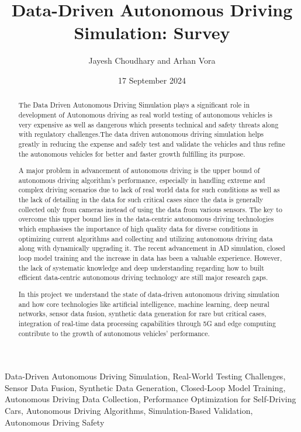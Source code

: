\documentclass[lettersize,journal]{IEEEtran}
\begin{document}
\title{Data-Driven Autonomous Driving Simulation: Survey}
\author{Jayesh Choudhary and Arhan Vora}
\date{17 September 2024}

\maketitle

\begin{abstract}
The Data Driven Autonomous Driving Simulation plays a significant role in development of Autonomous driving as real world testing of autonomous vehicles is very expensive as well as dangerous which presents technical and safety threats along with regulatory challenges.The data driven autonomous driving simulation helps greatly in reducing the expense and safely test and validate the vehicles and thus refine the autonomous vehicles for better and faster growth fulfilling its purpose.

A major problem in advancement of autonomous driving is the upper bound of autonomous driving algorithm's performance, especially in handling extreme and complex driving scenarios due to lack of real world data for such conditions as well as the lack of detailing in the data for such critical cases since the data is generally collected only from cameras instead of using the data from various sensors. The key to overcome this upper bound lies in the data-centric autonomous driving technologies which emphasises the importance of high quality data for diverse conditions in optimizing current algorithms and collecting and utilizing autonomous driving data along with dynamically upgrading it.
The recent advancement in AD simulation, closed loop model training and the increase in data has been a valuable experience. However, the lack of systematic knowledge and deep understanding regarding how to built efficient data-centric autonomous driving technology are still major research gaps.

In this project we understand the state of data-driven autonomous driving simulation and how core technologies like artificial intelligence, machine learning, deep neural networks, sensor data fusion, synthetic data generation for rare but critical cases, integration of real-time data processing capabilities through 5G and edge computing contribute to the growth of autonomous vehicles' performance.

\end{abstract}

\begin{IEEEkeywords}
Data-Driven Autonomous Driving Simulation, Real-World Testing Challenges, Sensor Data Fusion, Synthetic Data Generation, Closed-Loop Model Training, Autonomous Driving Data Collection, Performance Optimization for Self-Driving Cars, Autonomous Driving Algorithms, Simulation-Based Validation, Autonomous Driving Safety
\end{IEEEkeywords}
\end{document}
